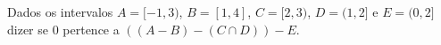 \item Dados os intervalos $A=[-1,3)$, $B=[1,4]$, $C=[2,3)$, $D=(1,2]$ e $E=(0,2]$ dizer se $0$ pertence a $((A-B)-(C\cap D))-E$.